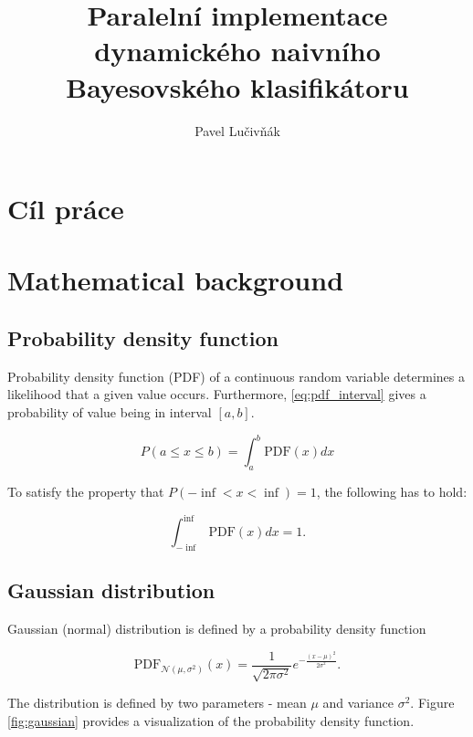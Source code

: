 \documentclass[thesis=B,english]{FITthesis}[2012/06/26]
\title{Paralelní implementace dynamického naivního Bayesovského klasifikátoru}
\author{Pavel Lučivňák} %
\begin{document}

\begin{introduction}
\end{introduction}

\chapter{Cíl práce}

\chapter{Mathematical background}

\section{Probability density function}

Probability density function (PDF) of a continuous random variable determines a likelihood that a given value occurs. Furthermore, \ref{eq:pdf_interval} gives a probability of value being in interval $[a,b]$.

\begin{equation} \label{eq:pdf_interval}
P(a \leq x \leq b) = \int_a^b \text{PDF}(x) dx
\end{equation}

To satisfy the property that $P(-\inf < x < \inf) = 1$, the following has to hold:

\begin{equation}
\int_{-\inf}^{\inf} \text{PDF}(x) dx = 1.
\end{equation}

\section{Gaussian distribution}

Gaussian (normal) distribution is defined by a probability density function

\begin{equation} \label{eq:gaussian_pdf}
\text{PDF}_{\mathcal{N}(\mu,\sigma^2)}(x) = \frac{1}{\sqrt{2 \pi \sigma^2}}e^{-\frac{(x-\mu)^2}{2 \sigma^2}}.
\end{equation}

The distribution is defined by two parameters - mean $\mu$ and variance $\sigma^2$. Figure \ref{fig:gaussian} provides a visualization of the probability density function.
\end{document}
